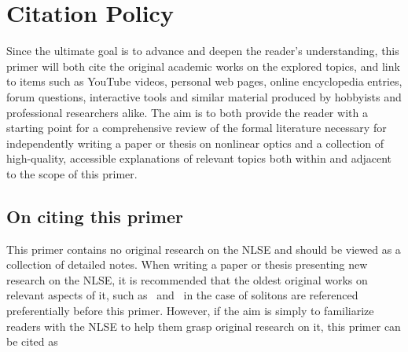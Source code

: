 \section{Citation Policy}
Since the ultimate goal is to advance and deepen the reader's understanding, this primer will both cite the original academic works on the explored topics, and link to items such as YouTube videos, personal web pages, online encyclopedia entries, forum questions, interactive tools and similar material produced by hobbyists and professional researchers alike. The aim is to both provide the reader with a starting point for a comprehensive review of the formal literature necessary for independently writing a paper or thesis on nonlinear optics and a collection of high-quality, accessible explanations of relevant topics both within and adjacent to the scope of this primer. 

\subsection{On citing this primer}
This primer contains no original research on the NLSE and should be viewed as a collection of detailed notes. When writing a paper or thesis presenting new research on the NLSE, it is recommended that the oldest original works on relevant aspects of it, such as~\cite{soliton_first_theory} and~\cite{Soliton_experimental_first} in the case of solitons are referenced preferentially before this primer. However, if the aim is simply to familiarize readers with the NLSE to help them grasp original research on it, this primer can be cited as 